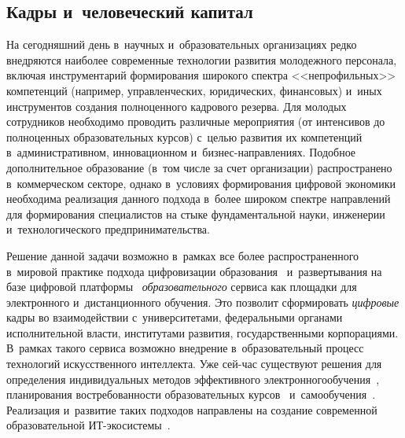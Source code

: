 \begin{multicols}{2}
\vspace*{-6pt}

\section{Кадры и~человеческий капитал}
\label{Staff}

На сегодняшний день в~научных и~образовательных организациях редко внедряются 
наиболее современные технологии развития молодежного персонала, включая 
инструментарий  формирования широкого спектра <<непрофильных>> компетенций 
(например, управленческих, юридических, финансовых) и~иных инструментов 
создания полноценного кадрового резерва. Для молодых сотрудников необходимо 
проводить различные мероприятия (от интенсивов до полноценных образовательных курсов) 
с~целью развития их компетенций в~административном, инновационном 
и~биз\-нес-на\-прав\-ле\-ни\-ях. Подобное дополнительное образование 
(в~том числе за счет организации) распространено в~коммерческом секторе, 
однако в~условиях формирования цифровой экономики  необходима реализация 
данного подхода в~более широком спектре направлений для формирования 
специалистов на стыке фундаментальной науки, инженерии и~технологического 
предпринимательства.

Решение данной задачи возможно в~рамках все\linebreak
 более распространенного в~мировой 
практике\linebreak
 подхода цифровизации образования~\cite{Paulsen2003} и~раз\-вер\-ты\-вания на 
базе цифровой платформы~\cite{Gorshenin2017} \textit{обра\-зо\-ва\-тельного} сервиса 
как площадки для электронного и~дис\-тан\-ци\-он\-но\-го обучения. Это позволит сформировать 
\textit{цифровые} кадры во взаимодействии с~университетами, федеральными 
органами исполнительной власти, институтами развития, государственными корпорациями. 
В~рамках такого серви\-са возможно внедрение в~образовательный процесс\linebreak
 технологий 
искусственного интеллекта. Уже сей-\linebreak час существуют решения для определения индивидуальных 
методов эффективного электронного\linebreak обучения~\cite{Villaverde2006}, планирования 
востребованности образовательных курсов~\cite{Kardan2013} 
и~самообучения~\cite{Kose2017}. Реализация и~развитие таких подходов на\-прав\-ле\-ны 
на создание современной образовательной \mbox{ИТ-эко}\-сис\-те\-мы~\cite{Gorshenin2018b}.

\vspace*{-6pt}


\end{multicols}
